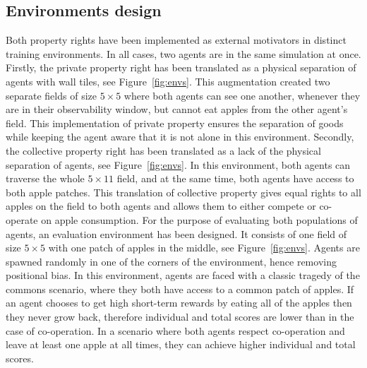 \documentclass[preprint,12pt,authoryear]{elsarticle}
\begin{document}
\subsection{Environments design}


Both property rights have been implemented as external motivators in distinct training environments. In all cases, two agents are in the same simulation at once. Firstly, the private property right has been translated as a physical separation of agents with wall tiles, see Figure~\ref{fig:envs}. This augmentation created two separate fields of size $5\times5$ where both agents can see one another, whenever they are in their observability window, but cannot eat apples from the other agent's field. This implementation of private property ensures the separation of goods while keeping the agent aware that it is not alone in this environment. Secondly, the collective property right has been translated as a lack of the physical separation of agents, see Figure~\ref{fig:envs}. In this environment, both agents can traverse the whole $5\times11$ field, and at the same time, both agents have access to both apple patches. This translation of collective property gives equal rights to all apples on the field to both agents and allows them to either compete or co-operate on apple consumption. For the purpose of evaluating both populations of agents, an evaluation environment has been designed. It consists of one field of size $5\times5$ with one patch of apples in the middle, see Figure~\ref{fig:envs}. Agents are spawned randomly in one of the corners of the environment, hence removing positional bias. In this environment, agents are faced with a classic tragedy of the commons scenario, where they both have access to a common patch of apples. If an agent chooses to get high short-term rewards by eating all of the apples then they never grow back, therefore individual and total scores are lower than in the case of co-operation. In a scenario where both agents respect co-operation and leave at least one apple at all times, they can achieve higher individual and total scores.
\end{document}
